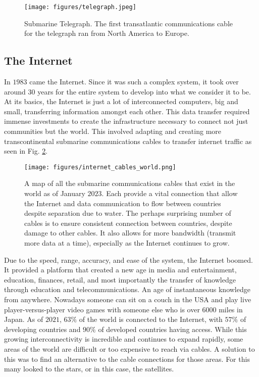 \documentclass[10pt]{article}
\begin{document}
\begin{figure}[h!]
\centering
\texttt{[image: figures/telegraph.jpeg]}
\caption{Submarine Telegraph. The first transatlantic communications cable for the telegraph ran from North America to Europe.\cite{Griffiths_CNN}}
\label{fig:telegraph_cable}
\end{figure}

\subsection{The Internet}
\label{internet_intro}

In $1983$ came the Internet. Since it was such a complex system, it took over around $30$ years for the entire system to develop into what we consider it to be. At its basics, the Internet is just a lot of interconnected computers, big and small, transferring information amongst each other\cite{Internet_Basics}. This data transfer required immense investments to create the infrastructure necessary to connect not just communities but the world. This involved adapting and creating more transcontinental submarine communications cables to transfer internet traffic as seen in Fig. \ref{fig:internet_cables}. 

\begin{figure}[h!]
\centering
\texttt{[image: figures/internet\_cables\_world.png]}
\caption{A map of all the submarine communications cables that exist in the world as of January $2023$. Each provide a vital connection that allow the Internet and data communication to flow between countries despite separation due to water. The perhaps surprising number of cables is to ensure consistent connection between countries, despite damage to other cables. It also allows for more bandwidth (transmit more data at a time), especially as the Internet continues to grow\cite{Submarine_Cable_Map}.}
\label{fig:internet_cables}
\end{figure}

Due to the speed, range, accuracy, and ease of the system, the Internet boomed. It provided a platform that created a new age in media and entertainment, education, finances, retail, and most importantly the transfer of knowledge through education and telecommunications. An age of instantaneous knowledge from anywhere. Nowadays someone can sit on a couch in the USA and play live player-versus-player video games with someone else who is over $6000$ miles in Japan. As of $2021$, $63\%$ of the world is connected to the Internet, with $57\%$ of developing countries and $90\%$ of developed countries having access\cite{internet_usage}\cite{Global_internet_2022}. While this growing interconnectivity is incredible and continues to expand rapidly, some areas of the world are difficult or too expensive to reach via cables. A solution to this was to find an alternative to the cable connections for those areas. For this many looked to the stars, or in this case, the satellites. 
\end{document}

